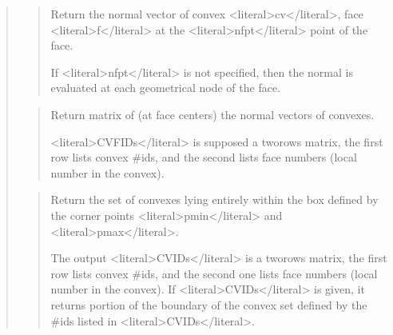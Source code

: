 \documentclass[a4paper,11pt,english]{sphinxmanual}
\begin{document}
\begin{quote}
\begin{quote}
\sphinxAtStartPar
Return the normal vector of convex \textless{}literal\textgreater{}cv\textless{}/literal\textgreater{}, face \textless{}literal\textgreater{}f\textless{}/literal\textgreater{} at the \textless{}literal\textgreater{}nfpt\textless{}/literal\textgreater{} point of the face.

\sphinxAtStartPar
If \textless{}literal\textgreater{}nfpt\textless{}/literal\textgreater{} is not specified, then the normal is evaluated at each
geometrical node of the face.
\end{quote}

\sphinxAtStartPar
{}
\begin{quote}

\sphinxAtStartPar
Return matrix of (at face centers) the normal vectors of convexes.

\sphinxAtStartPar
\textless{}literal\textgreater{}CVFIDs\textless{}/literal\textgreater{} is supposed a two\sphinxhyphen{}rows matrix, the first row lists convex
\#ids, and the second lists face numbers (local number in the convex).
\end{quote}

\sphinxAtStartPar
{}
\begin{quote}

\sphinxAtStartPar
Return the set of convexes lying entirely within the box defined by the corner points \textless{}literal\textgreater{}pmin\textless{}/literal\textgreater{} and \textless{}literal\textgreater{}pmax\textless{}/literal\textgreater{}.

\sphinxAtStartPar
The output \textless{}literal\textgreater{}CVIDs\textless{}/literal\textgreater{} is a two\sphinxhyphen{}rows matrix, the first row lists convex
\#ids, and the second one lists face numbers (local number in the
convex). If \textless{}literal\textgreater{}CVIDs\textless{}/literal\textgreater{} is given, it returns portion of the boundary of
the convex set defined by the \#ids listed in \textless{}literal\textgreater{}CVIDs\textless{}/literal\textgreater{}.
\end{quote}

\sphinxAtStartPar
{}
\begin{quote}


\end{quote}
\end{quote}
\end{document}
